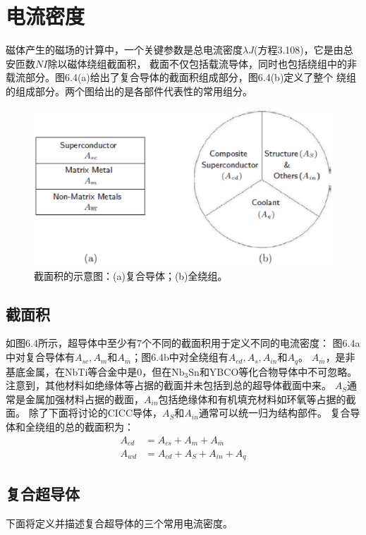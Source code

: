 \section{电流密度}
磁体产生的磁场的计算中，一个关键参数是总电流密度$\lambda J$(方程3.108)，它是由总安匝数$NI$除以磁体绕组截面积，
截面不仅包括载流导体，同时也包括绕组中的非载流部分。图6.4(a)给出了复合导体的截面积组成部分，图6.4(b)定义了整个
绕组的组成部分。两个图给出的是各部件代表性的常用组分。
\begin{figure}[htbp]
	\centering
	\includegraphics[scale=0.6]{chpt6/figs/fig6.4.eps}
	\caption{截面积的示意图：(a)复合导体；(b)全绕组。}
\end{figure}
\subsection{截面积}
如图6.4所示，超导体中至少有7个不同的截面积用于定义不同的电流密度：
图6.4a中对复合导体有$A_{sc},A_m$和$A_{\bar{m}}$；图6.4b中对全绕组有$A_{cd},A_s,A_{in}$和$A_q$。
$A_{\bar{m}}$，是非基底金属，在NbTi等合金中是0，但在$\mathrm{Nb_3 Sn}$和YBCO等化合物导体中不可忽略。
注意到，其他材料如绝缘体等占据的截面并未包括到总的超导体截面中来。
$A_S$通常是金属加强材料占据的截面，$A_{in}$包括绝缘体和有机填充材料如环氧等占据的截面。
除了下面将讨论的CICC导体，$A_S$和$A_{in}$通常可以统一归为结构部件。
复合导体和全绕组的总的截面积为：
\begin{subequations}
	\begin{align}
	A_{cd}&=A_{cs}+A_m+A_{\bar{m}}\\
	A_{wd}&=A_{cd}+A_S+A_{in}+A_q
	\end{align}
\end{subequations}

\subsection{复合超导体}
下面将定义并描述复合超导体的三个常用电流密度。

